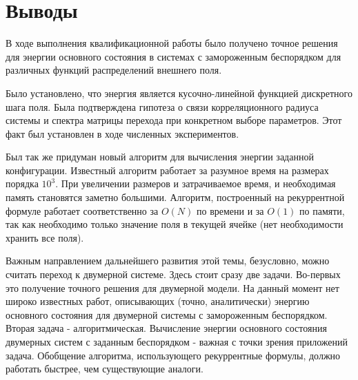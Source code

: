 \section{Выводы}
В ходе выполнения квалификационной работы было получено точное решения для энергии основного состояния в системах с замороженным беспорядком для различных функций распределений внешнего поля.

Было установлено, что энергия является кусочно-линейной функцией дискретного шага поля. Была подтверждена гипотеза о связи корреляционного радиуса системы и спектра матрицы перехода при конкретном выборе параметров. Этот факт был установлен в ходе численных экспериментов.

Был так же придуман новый алгоритм для вычисления энергии заданной конфигурации. Известный алгоритм работает за разумное время на размерах порядка $10^3$. При увеличении размеров и затрачиваемое время, и необходимая память становятся заметно большими. Алгоритм, построенный на рекуррентной формуле работает соответственно за $O(N)$ по времени и за $O(1)$ по памяти, так как необходимо только значение поля в текущей ячейке (нет необходимости хранить все поля).  

Важным направлением дальнейшего развития этой темы, безусловно, можно считать переход к двумерной системе. Здесь стоит сразу две задачи. Во-первых это получение точного решения для двумерной модели. На данный момент нет широко известных работ, описывающих (точно, аналитически) энергию основного состояния для двумерной системы с замороженным беспорядком. 
Вторая задача - алгоритмическая. Вычисление энергии основного состояния двумерных систем с заданным беспорядком - важная с точки зрения приложений задача. Обобщение алгоритма, использующего рекуррентные формулы, должно работать быстрее, чем существующие аналоги.
